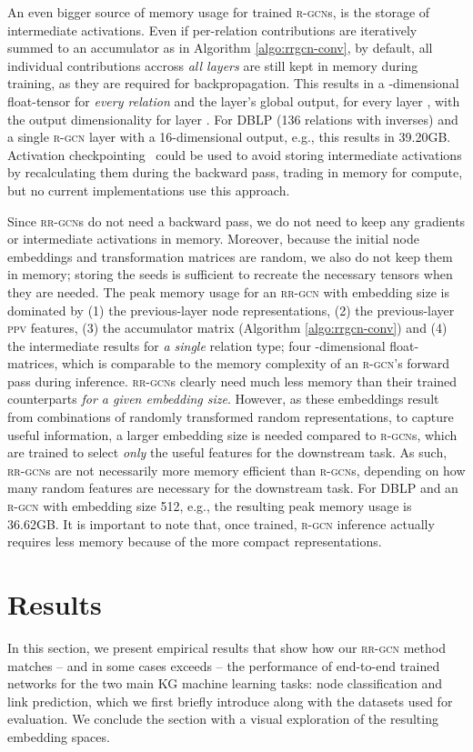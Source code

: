 \documentclass{llncs}
\begin{document}
An even bigger source of memory usage for trained \textsc{r-gcn}s, is the storage of intermediate activations. Even if per-relation contributions are iteratively summed to an accumulator as in Algorithm \ref{algo:rrgcn-conv}, by default, all individual contributions accross \textit{all layers} are still kept in memory during training, as they are required for backpropagation. This results in a -dimensional float-tensor for \textit{every relation}  and the layer's global output, for every layer , with  the output dimensionality for layer . For DBLP (136 relations with inverses) and a single \textsc{r-gcn} layer with a 16-dimensional output, e.g., this results in 39.20GB. Activation checkpointing~\cite{chen2016training} could be used to avoid storing intermediate activations by recalculating them during the backward pass, trading in memory for compute, but no current implementations use this approach.

Since \textsc{rr-gcn}s do not need a backward pass, we do not need to keep any gradients or intermediate activations in memory. Moreover, because the initial node embeddings and transformation matrices are random, we also do not keep them in memory; storing the seeds is sufficient to recreate the necessary tensors when they are needed. The peak memory usage for an \textsc{rr-gcn} with embedding size  is dominated by (1) the previous-layer node representations, (2) the previous-layer \textsc{ppv} features, (3) the accumulator matrix  (Algorithm \ref{algo:rrgcn-conv}) and (4) the intermediate results for \textit{a single} relation type; four -dimensional float-matrices, which is comparable to the memory complexity of an \textsc{r-gcn}'s forward pass during inference. \textsc{rr-gcn}s clearly need much less memory than their trained counterparts \textit{for a given embedding size}.
However, as these embeddings result from combinations of randomly transformed random representations, to capture useful information, a larger embedding size is needed compared to \textsc{r-gcn}s, which are trained to select \textit{only} the useful features for the downstream task.
As such, \textsc{rr-gcn}s are not necessarily more memory efficient than \textsc{r-gcn}s, depending on how many random features are necessary for the downstream task. For DBLP and an \textsc{r-gcn} with embedding size 512, e.g., the resulting peak memory usage is 36.62GB.
It is important to note that, once trained, \textsc{r-gcn} inference actually requires less memory because of the more compact representations.

\section{Results} \label{sec:results}
In this section, we present empirical results that show how our \textsc{rr-gcn} method matches -- and in some cases exceeds -- the performance of end-to-end trained networks for the two main KG machine learning tasks: node classification and link prediction, which we first briefly introduce along with the datasets used for evaluation. We conclude the section with a visual exploration of the resulting embedding spaces.
\end{document}

